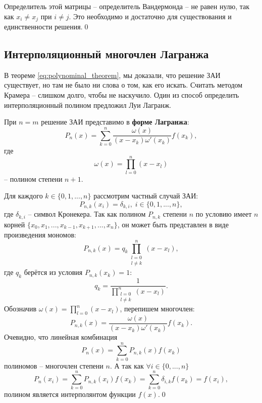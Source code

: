 \documentclass[../main.tex]{subfile}
\begin{document}
	Определитель этой матрицы -- определитель Вандермонда -- не равен нулю,
	так как $x_i\ne x_j$ при $i\ne j$. Это необходимо и достаточно для
	существования и единственности решения.\qed

\subsection{Интерполяционный многочлен Лагранжа}
В теореме \eqref{eq:polynominal_theorem}, мы доказали, что решение ЗАИ
существует, но там не было ни слова о том, как его искать. Считать методом
Крамера -- слишком долго, чтобы не наскучило. Один из способ определить
интерполяционный полином предложил Луи Лагранж.\newline

\begin{theorem}\label{eq:lagrange_polynomial}
	При $n=m$ решение ЗАИ представимо в \textbf{форме Лагранжа}:
	\[P_n(x)=\sum_{k=0}^{n}\frac{\omega(x)}{(x-x_k)\omega'(x_k)}f(x_k),\]
	где
	\[\omega(x)=\prod_{l=0}^{n}(x-x_l)\]
	-- полином степени $n+1$.
\end{theorem}

\beginproof

	Для каждого $k\in\{0,1,...,n\}$ рассмотрим частный случай ЗАИ:
	\[P_{n,k}(x_i)=\delta_{k,i},\;i\in\{0,1,...,n\},\]
	где $\delta_{k,i}$ -- символ Кронекера. Так как полином $P_{n,k}$
	степени $n$ по условию имеет $n$ корней $\{x_0, x_1, ..., x_{k-1},
	x_{k+1}, ..., x_n\}$, он может быть представлен в виде произведения
	мономов:
	\[P_{n,k}(x)=q_k\prod_{\substack{l=0\\ l\neq k}}^{n}(x-x_l),\]
	где $q_k$ берётся из условия $P_{n,k}(x_k)=1$:
	\[q_k=\frac{1}{\prod_{\substack{l=0\\ l\neq k}}^{n}(x-x_l)}.\]
	Обозначив $\omega(x)=\prod_{l=0}^{n}(x-x_l)$, перепишем многочлен:
	\[P_{n,k}(x)=\frac{\omega(x)}{(x-x_k)\omega'(x_k)}f(x_k).\]
	Очевидно, что линейная комбинация
	\[P_n(x)=\sum_{k=0}^{n}P_{n,k}(x)f(x_k)\]
	полиномов -- многочлен степени $n$. А так как $\forall i\in\{0,...,n\}$
	\[P_n(x_i)=\sum_{k=0}^{n}P_{n,k}(x_i)f(x_k)=\sum_{k=0}^{n}\delta_{i,k}
	f(x_k)=f(x_i),\]
	полином является интерполянтом функции $f(x)$.\qed
\end{document}
